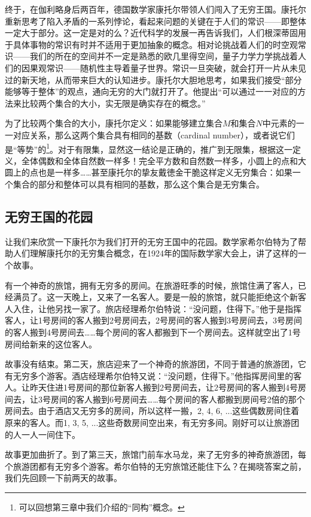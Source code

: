 \documentclass{article}
\begin{document}
终于，在伽利略身后两百年，德国数学家康托尔带领人们闯入了无穷王国。康托尔重新思考了陷入矛盾的一系列悖论，看起来问题的关键在于人们的常识——即整体一定大于部分。这一定是对的么？近代科学的发展一再告诉我们，人们根深蒂固用于具体事物的常识有时并不适用于更加抽象的概念。相对论挑战着人们的时空观常识——我们的所在的空间并不一定是熟悉的欧几里得空间，量子力学力学挑战着人们的因果观常识——随机性主导着量子世界。常识一旦突破，就会打开一片从未见过的新天地，从而带来巨大的认知进步。康托尔大胆地思考，如果我们接受“部分能够等于整体”的观点，通向无穷的大门就打开了。他提出“可以通过一一对应的方法来比较两个集合的大小，实无限是确实存在的概念。”

为了比较两个集合的大小，康托尔定义：如果能够建立集合$M$和集合$N$中元素的一一对应关系，那么这两个集合具有相同的基数（cardinal number），或者说它们是“等势”的\footnote{可以回想第三章中我们介绍的“同构”概念。}。对于有限集，显然这一结论是正确的，推广到无限集，根据这一定义，全体偶数和全体自然数一样多！完全平方数和自然数一样多，小圆上的点和大圆上的点也是一样多……甚至康托尔的挚友戴徳金干脆这样定义无穷集合：如果一个集合的部分和整体可以具有相同的基数，那么这个集合是无穷集合。

\subsection{无穷王国的花园}

让我们来欣赏一下康托尔为我们打开的无穷王国中的花园。数学家希尔伯特为了帮助人们理解康托尔的无穷集合概念，在1924年的国际数学家大会上，讲了这样的一个故事。

有一个神奇的旅馆，拥有无穷多的房间。在旅游旺季的时候，旅馆住满了客人，已经满员了。这一天晚上，又来了一名客人。要是一般的旅馆，就只能拒绝这个新客人入住，让他另找一家了。旅店经理希尔伯特说：“没问题，住得下。”他于是指挥客人，让1号房间的客人搬到2号房间去，2号房间的客人搬到3号房间去，3号房间的客人搬到4号房间去……每个房间的客人都搬到下一个房间去。这样就空出了1号房间给新来的这位客人。

故事没有结束。第二天，旅店迎来了一个神奇的旅游团，不同于普通的旅游团，它有无穷多个游客。酒店经理希尔伯特又说：“没问题，住得下。”他指挥房间里的客人。让昨天住进1号房间的那位新客人搬到2号房间去，让2号房间的客人搬到4号房间去，让3号房间的客人搬到6号房间去……每个房间的客人都搬到房间号2倍的那个房间去。由于酒店又无穷多的房间，所以这样一搬，2, 4, 6, ...这些偶数房间住着原来的客人。而1, 3, 5, ...这些奇数房间空出来，有无穷多间。刚好可以让旅游团的人一人一间住下。

故事更加曲折了。到了第三天，旅馆门前车水马龙，来了无穷多的神奇旅游团，每个旅游团都有无穷多个游客。希尔伯特的无穷旅馆还能住下么？在揭晓答案之前，我们先回顾一下前两天的故事。
\end{document}
